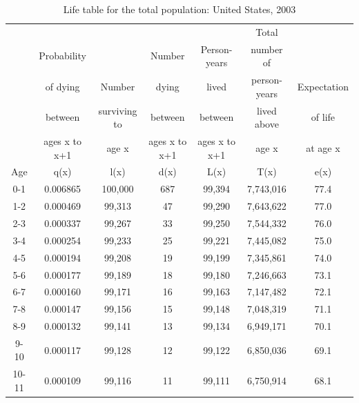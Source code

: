 \documentclass[12pt,a4paper]{article}
\begin{document}
\begin{longtable}{|c|c|c|c|c|c|c|}
\caption{Life table for the total population: United States, 2003 \citep{Arias2007}}
    \label{LifeTable}\\
 \hline 
      &               &              &               &               & Total        &              \\
       & Probability   &              & Number        & Person-years  & number of    &              \\
       & of dying      & Number       & dying         & lived         & person-years & Expectation  \\
       & between       & surviving to & between       & between       & lived above  & of life      \\
       & ages x to x+1 & age x        & ages x to x+1 & ages x to x+1 & age x        & at age x     \\
\hline  
Age    & q(x)          & l(x)         & d(x)          & L(x)          & T(x)         & e(x)         \\
\hline 
0-1    & 0.006865      & 100,000      & 687           & 99,394        & 7,743,016    & 77.4         \\
1-2    & 0.000469      & 99,313       & 47            & 99,290        & 7,643,622    & 77.0         \\
2-3    & 0.000337      & 99,267       & 33            & 99,250        & 7,544,332    & 76.0         \\
3-4    & 0.000254      & 99,233       & 25            & 99,221        & 7,445,082    & 75.0         \\
4-5    & 0.000194      & 99,208       & 19            & 99,199        & 7,345,861    & 74.0         \\
5-6    & 0.000177      & 99,189       & 18            & 99,180        & 7,246,663    & 73.1         \\
6-7    & 0.000160      & 99,171       & 16            & 99,163        & 7,147,482    & 72.1         \\
7-8    & 0.000147      & 99,156       & 15            & 99,148        & 7,048,319    & 71.1         \\
8-9    & 0.000132      & 99,141       & 13            & 99,134        & 6,949,171    & 70.1         \\
9-10   & 0.000117      & 99,128       & 12            & 99,122        & 6,850,036    & 69.1         \\
10-11  & 0.000109      & 99,116       & 11            & 99,111        & 6,750,914    & 68.1         \\

\end{longtable}
\end{document}
